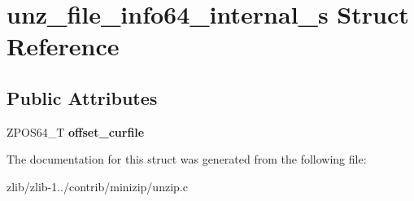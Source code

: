 \hypertarget{structunz__file__info64__internal__s}{\section{unz\+\_\+file\+\_\+info64\+\_\+internal\+\_\+s Struct Reference}
\label{structunz__file__info64__internal__s}
}
\subsection*{Public Attributes}
\begin{DoxyCompactItemize}
\item 
\hypertarget{structunz__file__info64__internal__s_a8a6ef9b7a073f5eea39f7bd7432f0042}{Z\+P\+O\+S64\+\_\+\+T {\bfseries offset\+\_\+curfile}}\label{structunz__file__info64__internal__s_a8a6ef9b7a073f5eea39f7bd7432f0042}

\end{DoxyCompactItemize}


The documentation for this struct was generated from the following file\+:\begin{DoxyCompactItemize}
\item 
zlib/zlib-\/1../contrib/minizip/unzip.\+c\end{DoxyCompactItemize}
